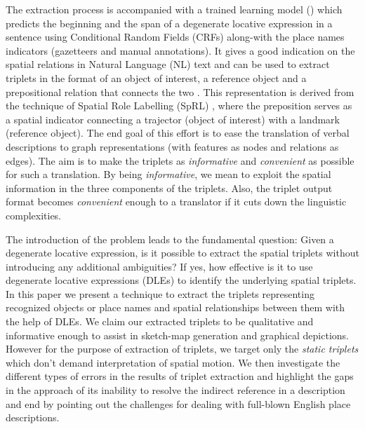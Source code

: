 \documentclass[letter]{sig-alternate}
\begin{document}
The extraction process is accompanied with a trained learning model (\cite{fei:locative}) which predicts the beginning and the span of a degenerate locative expression in a sentence using Conditional Random Fields (CRFs) along-with the place names indicators (gazetteers and manual annotations). It gives a good indication on the spatial relations in Natural Language (NL) text and can be used to extract triplets in the format of an object of interest, a reference object and a prepositional relation that connects the two . This representation is derived from the technique of Spatial Role Labelling (SpRL) \cite{Kordjamshidi:labelling}, where the preposition serves as a spatial indicator connecting a trajector (object of interest) with a landmark (reference object). The end goal of this effort is to ease the translation of verbal descriptions to graph representations (with features as nodes and relations as edges). The aim is to make the triplets as \textit{informative} and \textit{convenient} as possible for such a translation. By being \textit{informative}, we mean to exploit the spatial information in the three components of the triplets. Also, the triplet output format becomes \textit{convenient} enough to a translator if it cuts down the linguistic complexities.

The introduction of the problem leads to the fundamental question: Given a degenerate locative expression, is it possible to extract the spatial triplets without introducing any additional ambiguities? If yes, how effective is it to use degenerate locative expressions (DLEs) to identify the underlying spatial triplets. In this paper we present a technique to extract the triplets representing recognized objects or place names and spatial relationships between them with the help of DLEs. We claim our extracted triplets to be qualitative and informative enough to assist in sketch-map generation and graphical depictions. However for the purpose of extraction of triplets, we target only the \textit{static triplets} which don't demand interpretation of spatial motion. We then investigate the different types of errors in the results of triplet extraction and highlight the gaps in the approach of its inability to resolve the indirect reference in a description and end by pointing out the challenges for dealing with full-blown English place descriptions.
\end{document}
